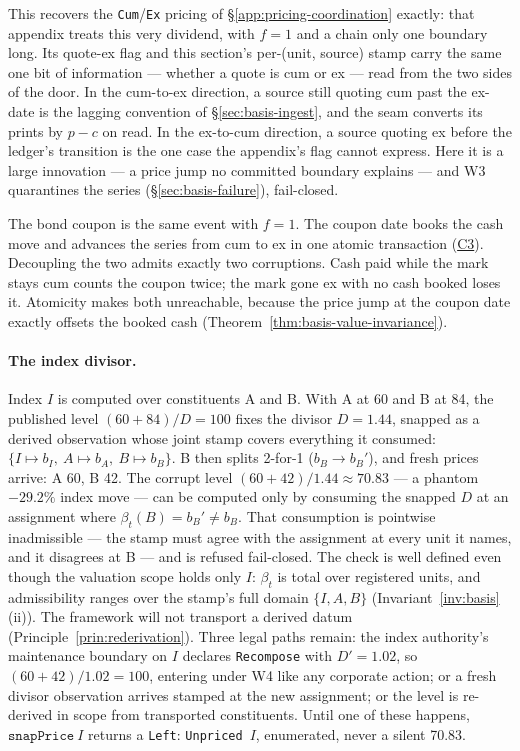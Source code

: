 This recovers the \texttt{Cum}/\texttt{Ex} pricing of
\S\ref{app:pricing-coordination} exactly: that appendix treats this very
dividend, with $f=1$ and a chain only one boundary long. Its quote-ex flag
and this section's per-(unit, source) stamp carry the same one bit of
information --- whether a quote is cum or ex --- read from the two sides of
the door. In the cum-to-ex direction, a source still quoting cum past the
ex-date is the lagging convention of \S\ref{sec:basis-ingest}, and the seam
converts its prints by $p-c$ on read. In the ex-to-cum direction, a source
quoting ex before the ledger's transition is the one case the appendix's flag
cannot express. Here it is a large innovation --- a price jump no committed
boundary explains --- and W3 quarantines the series
(\S\ref{sec:basis-failure}), fail-closed.

The bond coupon is the same event with $f=1$. The coupon date books the cash
move and advances the series from cum to ex in one atomic transaction
(\hyperref[cond:C3]{C3}). Decoupling the two admits exactly two corruptions.
Cash paid while the mark stays cum counts the coupon twice; the mark gone ex
with no cash booked loses it. Atomicity makes both unreachable, because the
price jump at the coupon date exactly offsets the booked cash
(Theorem~\ref{thm:basis-value-invariance}).

\paragraph{The index divisor.} Index $I$ is computed over constituents A and B. With A
at 60 and B at 84, the published level $(60+84)/D=100$ fixes the divisor $D=1.44$,
snapped as a derived observation whose joint stamp covers everything it consumed:
$\{I\mapsto b_I,\ A\mapsto b_A,\ B\mapsto b_B\}$. B then splits 2-for-1
($b_B\to b_B'$), and fresh prices arrive: A 60, B 42. The corrupt level
$(60+42)/1.44\approx70.83$ --- a phantom $-29.2\%$ index move --- can be computed only by
consuming the snapped $D$ at an assignment where $\beta_t(B)=b_B'\ne b_B$. That
consumption is pointwise inadmissible --- the stamp must agree with the
assignment at every unit it names, and it disagrees at B --- and is refused
fail-closed. The check is well
defined even though the valuation scope holds only $I$: $\beta_t$ is total over
registered units, and admissibility ranges over the stamp's full domain $\{I,A,B\}$
(Invariant~\ref{inv:basis}(ii)). The framework will not transport a derived datum
(Principle~\ref{prin:rederivation}). Three legal paths remain: the index authority's
maintenance boundary on $I$ declares \texttt{Recompose} with $D'=1.02$, so
$(60+42)/1.02=100$, entering under W4 like any corporate action; or a fresh divisor
observation arrives stamped at the new assignment; or the level is re-derived in scope
from transported constituents. Until one of these happens, $\texttt{snapPrice}\ I$
returns a \texttt{Left}: \texttt{Unpriced}~$I$, enumerated, never a silent 70.83.

